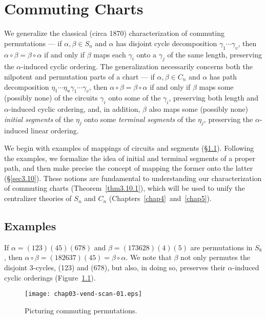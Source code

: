 \documentclass{surv-l}
\numberwithin{equation}{section}
\numberwithin{table}{section}
\numberwithin{figure}{section}
\theoremstyle{plain}
\theoremstyle{definition}
\begin{document}
\chapter{Commuting Charts}\label{chap3}

We generalize the classical (circa 1870) characterization of
commuting permutations --- if $\alpha,\beta\in S_{n}$ and $\alpha$
has disjoint cycle decomposition $\gamma_{1}\cdots\gamma_{v}$,
then $\alpha\circ\beta=\beta \circ\alpha$ if and only if $\beta$
maps each $\gamma_{i}$ onto a $\gamma_{j}$ of the same length,
preserving the $\alpha$-induced cyclic ordering. The
generalization necessarily concerns both the nilpotent and
permutation parts of a chart --- if $\alpha,\beta\in C_{n}$ and
$\alpha$ has path decomposition
$\eta_{1}\cdots\eta_{u}\gamma_{1}\cdots\gamma_{v}$, then $\alpha
\circ\beta=\beta \circ\alpha$ if and only if $\beta$ maps some
(possibly none) of the circuits $\gamma_{i}$ onto some of the
$\gamma_{i}$, preserving both length and $\alpha$-induced cyclic
ordering, and, in addition, $\beta$ also maps some (possibly none)
\emph{initial segments} of the
$\eta_{j}$ onto some \emph{terminal segments} of the $\eta_{j}$, preserving the $\alpha$-induced
linear ordering.

We begin with examples of mappings of circuits and segments
(\S\ref{sec3.9}). Following the examples, we formalize the idea of
initial and terminal segments of a proper path, and then make
precise the concept of mapping the former onto the latter
(\S\ref{sec3.10}). These notions are fundamental to understanding
our characterization of commuting charts
(Theorem~\ref{thm3.10.1}), which will be used to unify the
centralizer theories of $S_{n}$ and $C_{n}$
(Chapters~\ref{chap4}~and~\ref{chap5}).

\setcounter{section}{8}
\section{Examples}\label{sec3.9}

If $\alpha=(123)(45)(678)$ and $\beta=(173628)(4)(5)$ are
permutations in $S_{8}$, then $\alpha \circ\beta=(182637)(45) =\beta
\circ\alpha$. We note that $\beta$ not only permutes the disjoint
3-cycles, (123) and (678), but also, in doing so, preserves their
$\alpha$-induced cyclic orderings (Figure~\ref{fig3.9.1}).

\begin{figure}[!h]
\texttt{[image: chap03-vend-scan-01.eps]}
\caption{Picturing commuting permutations.}\label{fig3.9.1}
\end{figure}
\end{document}
